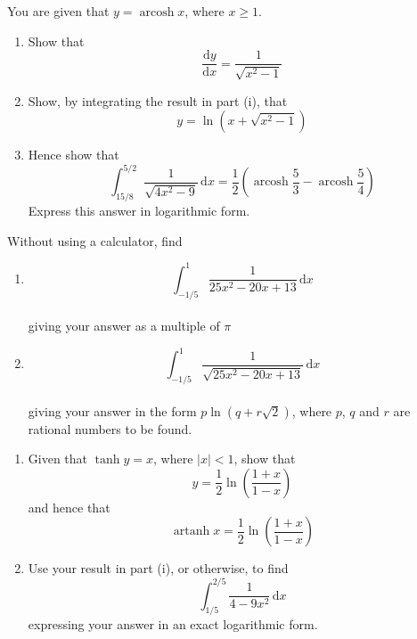 \documentclass[leqno]{article}
\begin{document}
\begin{enumerate}[
  label=\textbf{\arabic*.},
  leftmargin=*,
  topsep=0pt,
  partopsep=0pt,
  parsep=0pt
]
\newpage


\questionitem

You are given that $y=\operatorname{arcosh}x$, where $x\ge 1$. \\

\begin{enumerate}[label=(\roman*), start=1]
  \item Show that
  \[
  \frac{\mathrm{d}y}{\mathrm{d}x}=\frac{1}{\sqrt{x^2-1}}
  \]
  \item Show, by integrating the result in part (i), that
  \[
  y=\ln\left(x+\sqrt{x^2-1}\right)
  \]
  \item Hence show that
  \[
  \int_{15/8}^{5/2} \frac{1}{\sqrt{4x^2-9}}\,\mathrm{d}x=\frac{1}{2}\left(\operatorname{arcosh}\frac{5}{3}-\operatorname{arcosh}\frac{5}{4}\right)
  \]
  Express this answer in logarithmic form.  \\
\end{enumerate}

\newpage

\questionitem

Without using a calculator, find \\
\begin{enumerate}[label=\textbf{(\alph*)}]
  \item
  \[
  \int_{-1/5}^{1} \frac{1}{25x^2-20x+13}\,\mathrm{d}x
  \] \\
  giving your answer as a multiple of $\pi$  \\
  \item
  \[
  \int_{-1/5}^{1} \frac{1}{\sqrt{25x^2-20x+13}}\,\mathrm{d}x
  \] \\
  giving your answer in the form $p\ln(q+r\sqrt{2})$, where $p$, $q$ and $r$ are rational numbers to be found.  \\
\end{enumerate}

\newpage

\questionitem

\begin{enumerate}[label=(\roman*)]
  \item Given that $\tanh y=x$, where $|x|<1$, show that
  \[
  y=\frac{1}{2}\ln\left(\frac{1+x}{1-x}\right)
  \]
  and hence that
  \[
  \operatorname{artanh}x=\frac{1}{2}\ln\left(\frac{1+x}{1-x}\right)
  \]
  \item Use your result in part (i), or otherwise, to find
  \[
  \int_{1/5}^{2/5} \frac{1}{4-9x^2}\,\mathrm{d}x
  \]
  expressing your answer in an exact logarithmic form.  \\
\end{enumerate}


\end{enumerate}
\end{document}
